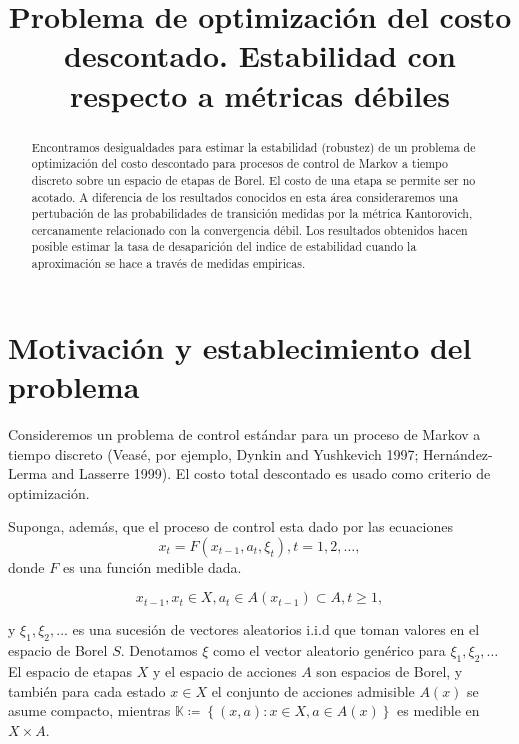 \documentclass[11pt, spanish]{amsart}
\begin{document}
\title{Problema de optimización del costo descontado. Estabilidad con respecto
a métricas débiles}
\begin{abstract}
Encontramos desigualdades para estimar la estabilidad (robustez) de
un problema de optimización del costo descontado para procesos de
control de Markov a tiempo discreto sobre un espacio de etapas de
Borel. El costo de una etapa se permite ser no acotado. A diferencia
de los resultados conocidos en esta área consideraremos una pertubación
de las probabilidades de transición medidas por la métrica Kantorovich,
cercanamente relacionado con la convergencia débil. Los resultados
obtenidos hacen posible estimar la tasa de desaparición del indice
de estabilidad cuando la aproximación se hace a través de medidas
empiricas. 
\end{abstract}

\maketitle
%

\section{Motivación y establecimiento del problema}

Consideremos un problema de control estándar para un proceso de Markov
a tiempo discreto (Veasé, por ejemplo, Dynkin and Yushkevich 1997;
Hernández-Lerma and Lasserre 1999). El costo total descontado es usado
como criterio de optimización. 

Suponga, además, que el proceso de control esta dado por las ecuaciones
\begin{equation}
x_{t}=F\left(x_{t-1},a_{t},\xi_{t}\right),t=1,2,\ldots,\label{eq:control_process}
\end{equation}
donde $F$ es una función medible dada. 

\[
x_{t-1},x_{t}\in X,a_{t}\in A\left(x_{t-1}\right)\subset A,t\geq1,
\]

y $\xi_{1},\xi_{2},\ldots$ es una sucesión de vectores aleatorios
i.i.d que toman valores en el espacio de Borel $S$. Denotamos $\xi$
como el vector aleatorio genérico para $\xi_{1},\xi_{2},\ldots$ El
espacio de etapas $X$ y el espacio de acciones $A$ son espacios
de Borel, y también para cada estado $x\in X$ el conjunto de acciones
admisible $A\left(x\right)$ se asume compacto, mientras $\mathbb{K}\coloneqq\left\{ \left(x,a\right):x\in X,a\in A\left(x\right)\right\} $
es medible en $X\times A$. 
\end{document}
